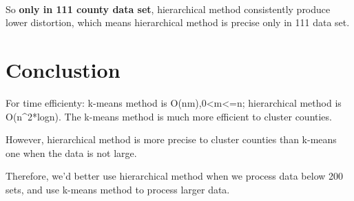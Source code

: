 \documentclass[11pt]{article}
\begin{document}
    \begin{center}
    \end{center}
    { \hspace*{\fill} \\}
    
    So \textbf{only in 111 county data set}, hierarchical method
consistently produce lower distortion, which means hierarchical method
is precise only in 111 data set.

    \section{Conclustion}\label{conclustion}

    For time efficienty: k-means method is O(nm),0\textless{}m\textless{}=n;
hierarchical method is O(n\^{}2*logn). The k-means method is much more
efficient to cluster counties.

However, hierarchical method is more precise to cluster counties than
k-means one when the data is not large.

Therefore, we'd better use hierarchical method when we process data
below 200 sets, and use k-means method to process larger data.


    
    
    
    
\end{document}
